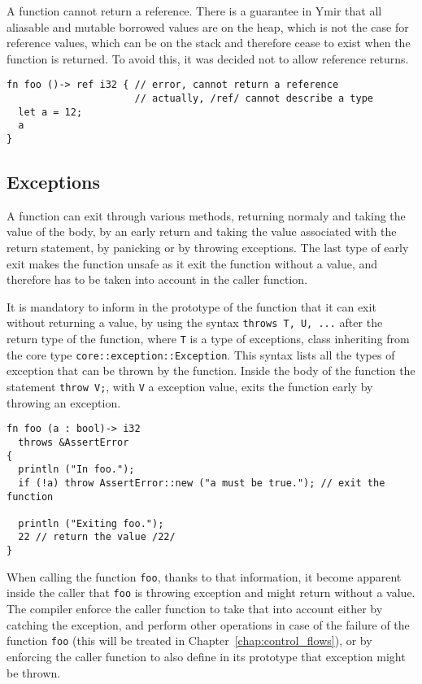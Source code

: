 A function cannot return a reference. There is a guarantee in Ymir that all
aliasable and mutable borrowed values are on the heap, which is not the case for
reference values, which can be on the stack and therefore cease to exist when
the function is returned. To avoid this, it was decided not to allow reference
returns.

\begin{lstlisting}[style=coloredverbatim]
fn foo ()-> ref i32 { // error, cannot return a reference
                      // actually, /ref/ cannot describe a type
  let a = 12;
  a
}
\end{lstlisting}

\subsection {Exceptions}

A function can exit through various methods, returning normaly and taking the
value of the body, by an early return and taking the value associated with the
return statement, by panicking or by throwing exceptions. The last type of early
exit makes the function unsafe as it exit the function without a value, and
therefore has to be taken into account in the caller function.

It is mandatory to inform in the prototype of the function that it can exit
without returning a value, by using the syntax \texttt{throws T, U, ...} after
the return type of the function, where \texttt{T} is a type of exceptions, class
inheriting from the core type \texttt{core::exception::Exception}. This syntax
lists all the types of exception that can be thrown by the function. Inside the
body of the function the statement \texttt{throw V;}, with \texttt{V} a
exception value, exits the function early by throwing an exception.

\begin{lstlisting}[style=coloredverbatim]
fn foo (a : bool)-> i32
  throws &AssertError
{
  println ("In foo.");
  if (!a) throw AssertError::new ("a must be true."); // exit the function

  println ("Exiting foo.");
  22 // return the value /22/
}
\end{lstlisting}


When calling the function \texttt{foo}, thanks to that information, it become
apparent inside the caller that \texttt{foo} is throwing exception and might
return without a value. The compiler enforce the caller function to take that
into account either by catching the exception, and perform other operations in
case of the failure of the function \texttt{foo} (this will be treated in
Chapter~\ref{chap:control_flows}), or by enforcing the caller function to also
define in its prototype that exception might be thrown.


